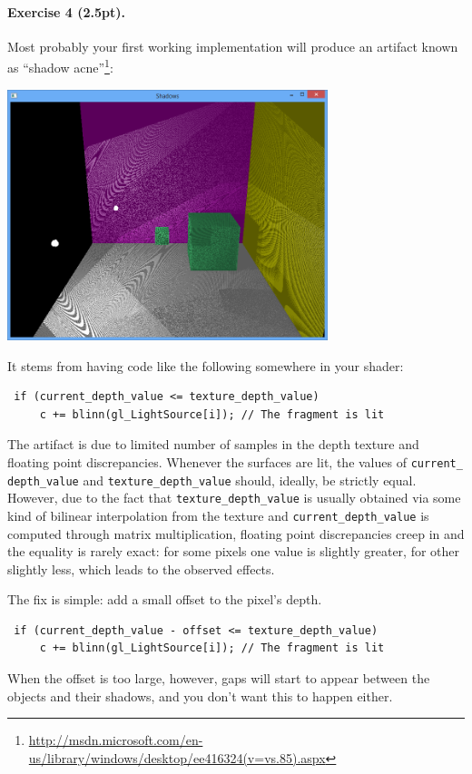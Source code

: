 \documentclass{article}
\newenvironment{exercise}[2]{\paragraph{Exercise #1 (#2pt).} }{
\medskip}
\begin{document}
\begin{exercise}{4}{2.5}
Most probably your first working implementation will produce an artifact known as ``shadow acne''\footnote{\url{http://msdn.microsoft.com/en-us/library/windows/desktop/ee416324(v=vs.85).aspx}}:
\begin{center}
\includegraphics[width=0.7\textwidth]{shadow_acne.png}
\end{center}
It stems from having code like the following somewhere in your shader:
\begin{verbatim}
 if (current_depth_value <= texture_depth_value)
     c += blinn(gl_LightSource[i]); // The fragment is lit
\end{verbatim}
The artifact is due to limited number of samples in the depth texture and floating point discrepancies. Whenever the surfaces are lit, the values of \verb#current_# \verb#depth_value# and \verb#texture_depth_value# should, ideally, be strictly equal. However, due to the fact that \verb#texture_depth_value# is usually obtained via some kind of bilinear interpolation from the texture and \verb#current_depth_value# is computed through matrix multiplication, floating point discrepancies creep in and the equality is rarely exact: for some pixels one value is slightly greater, for other slightly less, which leads to the observed effects.

The fix is simple: add a small offset to the pixel's depth.
\begin{verbatim}
 if (current_depth_value - offset <= texture_depth_value)
     c += blinn(gl_LightSource[i]); // The fragment is lit
\end{verbatim}

When the offset is too large, however, gaps will start to appear between the objects and their shadows, and you don't want this to happen either.
\end{exercise}
\end{document}
